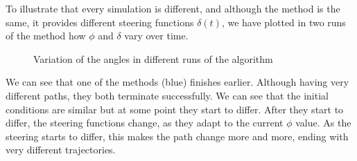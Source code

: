 To illustrate that every simulation is different, and although the method is the same, it provides different steering functions $\delta(t)$, we have plotted in two runs of the method how $\phi$ and $\delta$ vary over time.

\begin{figure}[H] 
    \centering
    \hspace{0.5cm}%
    \caption{Variation of the angles in different runs of the algorithm}
\end{figure}

We can see that one of the methods (blue) finishes earlier. Although having very different paths, they both terminate successfully. We can see that the initial conditions are similar but at some point they start to differ. After they start to differ, the steering functions change, as they adapt to the current $\phi$ value. As the steering starts to differ, this makes the path change more and more, ending with very different trajectories.